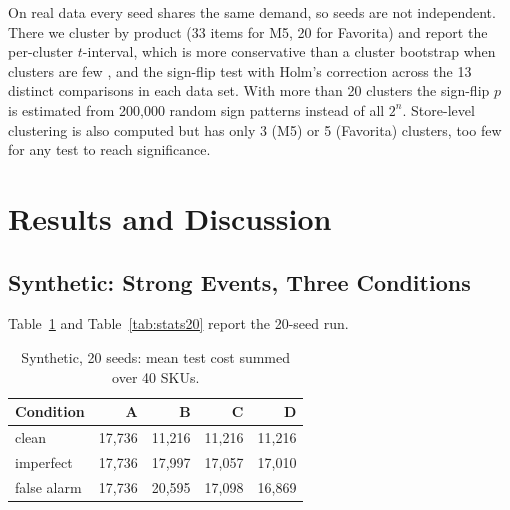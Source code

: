 On real data every seed shares the same demand, so seeds are not independent. There we cluster by product (33 items for M5, 20 for Favorita) and report the per-cluster $t$-interval, which is more conservative than a cluster bootstrap when clusters are few \cite{cameron2008bootstrap}, and the sign-flip test with Holm's correction across the 13 distinct comparisons in each data set. With more than 20 clusters the sign-flip $p$ is estimated from 200{,}000 random sign patterns instead of all $2^n$. Store-level clustering is also computed but has only 3 (M5) or 5 (Favorita) clusters, too few for any test to reach significance.

\section{Results and Discussion}
\label{sec:results}

\subsection{Synthetic: Strong Events, Three Conditions}
Table~\ref{tab:cost20} and Table~\ref{tab:stats20} report the 20-seed run.

\begin{table}[t]
\centering
\caption{Synthetic, 20 seeds: mean test cost summed over 40 SKUs.}
\label{tab:cost20}
\setlength{\tabcolsep}{4pt}
\footnotesize
\begin{tabular}{@{}lrrrr@{}}
\toprule
\textbf{Condition} & \textbf{A} & \textbf{B} & \textbf{C} & \textbf{D} \\
\midrule
clean       & 17{,}736 & 11{,}216 & 11{,}216 & 11{,}216 \\
imperfect   & 17{,}736 & 17{,}997 & 17{,}057 & 17{,}010 \\
false alarm & 17{,}736 & 20{,}595 & 17{,}098 & 16{,}869 \\
\bottomrule
\end{tabular}
\end{table}

